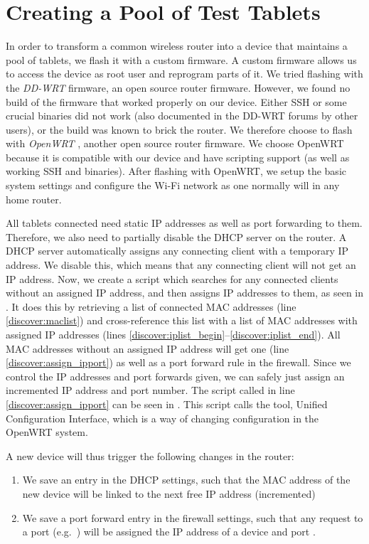 \section{Creating a Pool of Test Tablets}\label{sec:pool_of_tablets}
In order to transform a common wireless router into a device that maintains a pool of tablets, we flash it with a custom firmware. A custom firmware allows us to access the device as root user and reprogram parts of it. We tried flashing with the \emph{DD-WRT} \parencite{ddwrt} firmware, an open source router firmware. However, we found no build of the firmware that worked properly on our device. Either SSH or some crucial binaries did not work (also documented in the DD-WRT forums by other users), or the build was known to brick the router. We therefore choose to flash with \emph{OpenWRT} \parencite{openwrt}, another open source router firmware. We choose OpenWRT because it is compatible with our device and have scripting support (as well as working SSH and binaries). After flashing with OpenWRT, we setup the basic system settings and configure the Wi-Fi network as one normally will in any home router.

All tablets connected need static IP addresses as well as port forwarding to them. Therefore, we also need to partially disable the DHCP server on the router. A DHCP server automatically assigns any connecting client with a temporary IP address. We disable this, which means that any connecting client will not get an IP address. Now, we create a script which searches for any connected clients without an assigned IP address, and then assigns IP addresses to them, as seen in . It does this by retrieving a list of connected MAC addresses (line \ref{discover:maclist}) and cross-reference this list with a list of MAC addresses with assigned IP addresses (lines \ref{discover:iplist_begin}--\ref{discover:iplist_end}). All MAC addresses without an assigned IP address will get one (line \ref{discover:assign_ipport}) as well as a port forward rule in the firewall. Since we control the IP addresses and port forwards given, we can safely just assign an incremented IP address and port number. The script called in line \ref{discover:assign_ipport} can be seen in . This script calls the  tool, Unified Configuration Interface, which is a way of changing configuration in the OpenWRT system.

A new device will thus trigger the following changes in the router:
\begin{enumerate}
  \item We save an entry in the DHCP settings, such that the MAC address of the new device will be linked to the next free IP address (incremented)
  \item We save a port forward entry in the firewall settings, such that any request to a port (e.g.\ ) will be assigned the IP address of a device and port .
\end{enumerate}

